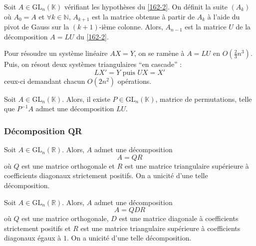   
  \begin{proposition}
    Soit $A \in \mathrm{GL}_n(\mathbb{K})$ vérifiant les hypothèses du \cref{162-2}. On définit la suite $(A_k)$ où $A_0 = A$ et $\forall k \in \mathbb{N}$, $A_{k+1}$ est la matrice obtenue à partir de $A_k$ à l'aide du pivot de Gauss sur la $(k+1)$-ième colonne. Alors, $A_{n-1}$ est la matrice $U$ de la décomposition $A = LU$ du \cref{162-2}.
  \end{proposition}
  
  \begin{remark}
    Pour résoudre un système linéaire $AX = Y$, on se ramène à $A = LU$ en $O \left( \frac{2}{3}n^3 \right)$. Puis, on résout deux systèmes triangulaires ``en cascade'' :
    \[ LX' = Y \text{ puis } UX = X' \]
    ceux-ci demandant chacun $O(2n^2)$ opérations.
  \end{remark}
  
  \begin{theorem}
    Soit $A \in \mathrm{GL}_n(\mathbb{K})$. Alors, il existe $P \in \mathrm{GL}_n(\mathbb{K})$, matrice de permutations, telle que $P^{-1}A$ admet une décomposition $LU$.
  \end{theorem}
  
  \subsubsection{Décomposition QR}
  
  
  \begin{theorem}[Décomposition QR]
    Soit $A \in \mathrm{GL}_n(\mathbb{R})$. Alors, $A$ admet une décomposition
    \[ A = QR \]
    où $Q$ est une matrice orthogonale et $R$ est une matrice triangulaire supérieure à coefficients diagonaux strictement positifs. On a unicité d'une telle décomposition.
  \end{theorem}
  
  \begin{corollary}
    Soit $A \in \mathrm{GL}_n(\mathbb{R})$. Alors, $A$ admet une décomposition
    \[ A = QDR \]
    où $Q$ est une matrice orthogonale, $D$ est une matrice diagonale à coefficients strictement positifs et $R$ est une matrice triangulaire supérieure à coefficients diagonaux égaux à $1$. On a unicité d'une telle décomposition.
  \end{corollary}
  
